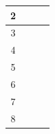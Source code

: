 \documentclass[11pt, a4paper]{article}
\begin{document}
\begin{landscape}
\begin{longtable}{|c|c|c|c|}
       2&         &                 &                    \\ \hline
       
       3&         &                 &                     \\ \hline
   
       4&         &                 &                    \\ \hline
   
       5&         &                 &                     \\ \hline
     
       6&         &                 &                    \\ \hline
    
       7&         &                 &                     \\ \hline
     
       8&         &                 &                    \\ \hline
\end{longtable}
\end{landscape}
\end{document}
